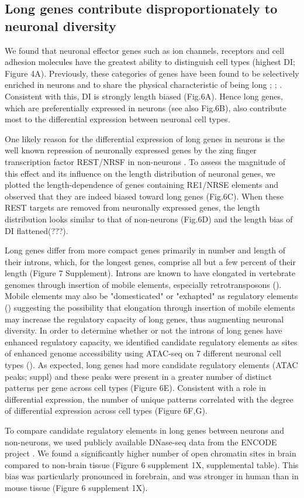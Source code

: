\subsection{Long genes contribute disproportionately to neuronal diversity}

We found that neuronal effector genes such as ion channels, receptors and cell adhesion molecules have the greatest ability to distinguish cell types (highest DI; Figure 4A). Previously, these categories of genes have been found to be selectively enriched in neurons and to share the physical characteristic of being long \cite{Sugino_2014}; \cite{Gabel_2015}; \cite{Zylka_2015}. Consistent with this, DI is strongly length biased (Fig.6A). Hence long genes, which are preferentially expressed in neurons (see also Fig.6B), also contribute most to the differential expression between neuronal cell types. 

One likely reason for the differential expression of long genes in neurons is the well known repression of neuronally expressed genes by the zing finger transcription factor REST/NRSF in non-neurons \cite{RN1}\cite{RN2a}. To assess the magnitude of this effect and its influence on the length distribution of neuronal genes, we plotted the length-dependence of genes containing RE1/NRSE elements and observed that they are indeed biased toward long genes (Fig.6C). When these REST targets are removed from neuronally expressed genes, the length distribution looks similar to that of non-neurons (Fig.6D) and the length bias of DI flattened(???).

Long genes differ from more compact genes primarily in number and length of their introns, which, for the longest genes, comprise all but a few percent of their length (Figure 7 Supplement). Introns are known to have elongated in vertebrate genomes through insertion of mobile elements, especially retrotransposons (). Mobile elements may also be "domesticated" or "exhapted" as regulatory elements () suggesting the possibility that elongation through insertion of mobile elements may increase the regulatory capacity of long genes, thus augmenting neuronal diversity. In order to determine whether or not the introns of long genes have enhanced regulatory capacity, we identified candidate regulatory elements as sites of enhanced genome accessibility using ATAC-seq on 7 different neuronal cell types (). As expected, long genes had more candidate regulatory elements (ATAC peaks; suppl) and these peaks were present in a greater number of distinct patterns per gene across cell types (Figure 6E). Consistent with a role in differential expression, the number of unique patterns correlated with the degree of differential expression across cell types (Figure 6F,G).

To compare candidate regulatory elements in long genes between neurons and non-neurons, we used publicly available DNase-seq data from the ENCODE project \cite{Dunham_2012}. We found a significantly higher number of open chromatin sites in brain compared to non-brain tissue (Figure 6 supplement 1X, supplemental table). This bias was  particularly pronounced in forebrain, and was stronger in human than in mouse tissue (Figure 6 supplement 1X).